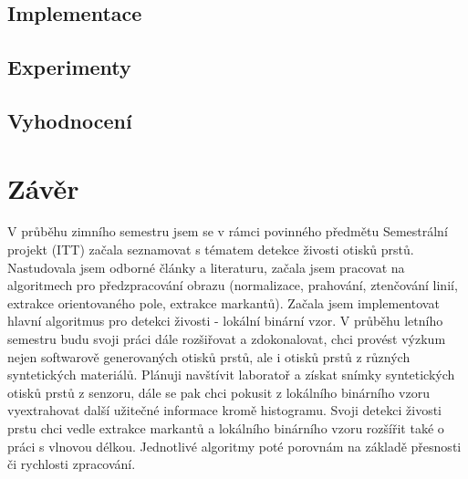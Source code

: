 \section{Implementace}

\section{Experimenty}

\section{Vyhodnocení}






\label{citace}



\chapter{Závěr}
V průběhu zimního semestru jsem se v rámci povinného předmětu Semestrální projekt (ITT) začala seznamovat s tématem detekce živosti otisků prstů. Nastudovala jsem odborné články a literaturu, začala jsem pracovat na algoritmech pro předzpracování obrazu (normalizace, prahování, ztenčování linií, extrakce orientovaného pole, extrakce markantů). Začala jsem implementovat hlavní algoritmus pro detekci živosti - lokální binární vzor. V průběhu letního semestru budu svoji práci dále rozšiřovat a zdokonalovat, chci provést výzkum nejen softwarově generovaných otisků prstů, ale i otisků prstů z různých syntetických materiálů. Plánuji navštívit laboratoř a získat snímky syntetických otisků prstů z senzoru, dále se pak chci pokusit z lokálního binárního vzoru vyextrahovat další užitečné informace kromě histogramu. Svoji detekci živosti prstu chci vedle extrakce markantů a lokálního binárního vzoru rozšířit také o práci s vlnovou délkou. Jednotlivé algoritmy poté porovnám na základě přesnosti či rychlosti zpracování. 

\label{zaver}


